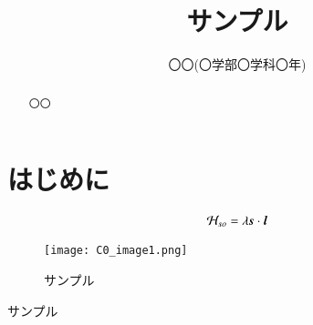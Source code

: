 \documentclass[a4paper,11pt]{jsarticle}
\numberwithin{equation}{section}
\newcommand{\bvec}[1]{\mbox{\boldmath $#1$}}
\begin{document}
\title{サンプル}
\author{〇〇(〇学部〇学科〇年)}
\date{}
\maketitle

\setcounter{section}{0}

\begin{abstract}
  〇〇
\end{abstract} 

\section{はじめに}

\begin{align}
  \mathcal{H} _{so} =\lambda \bvec{s}\cdot \bvec{l}
\end{align}

\begin{wrapfigure}{r}[0pt]{0.4\textwidth}
  \centering
    \texttt{[image: C0\_image1.png]}
  \caption{サンプル}
  \label{fig:1}
 \end{wrapfigure}


\begin{thebibliography}{99}
  サンプル
\end{thebibliography}
\end{document}

